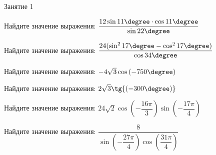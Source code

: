 %

\begin{class}[number=1]
	\begin{listofex}
		\item Занятие 1
	\end{listofex}
\end{class}

\begin{homework}[number=3]
	\begin{listofex}
		\item Найдите значение выражения: \( \dfrac{12 \sin{11\degree} \cdot \cos{11\degree}}{\sin{22\degree}} \)
		\item Найдите значение выражения: \( \dfrac{24 (\sin^2{17\degree} - \cos^2{17\degree})}{\cos{34\degree}} \)
		\item Найдите значение выражения: \( -4\sqrt{3}\cos{(-750\degree)} \)
		\item Найдите значение выражения: \( 2\sqrt{3}\tg{(-300\degree)} \)
		\item Найдите значение выражения: \( 24\sqrt{2}\cos{\left( -\dfrac{16\pi}{3}\right)}\sin{\left( -\dfrac{17\pi}{4} \right)} \)
		\item Найдите значение выражения: \( \dfrac{8}{\sin{\left(-\dfrac{27\pi}{4}\right)}\cos{\left(\dfrac{31\pi}{4}\right)}} \)
		

\end{listofex}
\end{homework}
